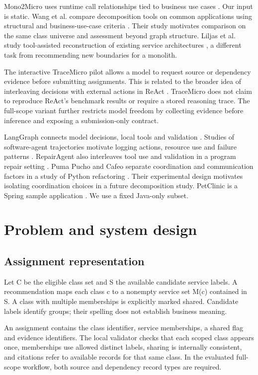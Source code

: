 Mono2Micro uses runtime call relationships tied to business use cases \cite{kalia2021}. Our input is static. Wang et al. compare decomposition tools on common applications using structural and business-use-case criteria \cite{wang2024}. Their study motivates comparison on the same class universe and assessment beyond graph structure. Liljas et al. study tool-assisted reconstruction of existing service architectures \cite{liljas2026}, a different task from recommending new boundaries for a monolith.

The interactive TraceMicro pilot allows a model to request source or dependency evidence before submitting assignments. This is related to the broader idea of interleaving decisions with external actions in ReAct \cite{yao2023}. TraceMicro does not claim to reproduce ReAct's benchmark results or require a stored reasoning trace. The full-scope variant further restricts model freedom by collecting evidence before inference and exposing a submission-only contract.

LangGraph connects model decisions, local tools and validation \cite{langgraph}. Studies of software-agent trajectories motivate logging actions, resource use and failure patterns \cite{trajectories2025}. RepairAgent also interleaves tool use and validation in a program repair setting \cite{repairagent2025}. Puma Pucho and Cafeo separate coordination and communication factors in a study of Python refactoring \cite{puchocafeo2026}. Their experimental design motivates isolating coordination choices in a future decomposition study. PetClinic is a Spring sample application \cite{petclinic}. We use a fixed Java-only subset.

\section{Problem and system design}

\subsection{Assignment representation}

Let C be the eligible class set and S the available candidate service labels. A recommendation maps each class c to a nonempty service set M(c) contained in S. A class with multiple memberships is explicitly marked shared. Candidate labels identify groups; their spelling does not establish business meaning.

An assignment contains the class identifier, service memberships, a shared flag and evidence identifiers. The local validator checks that each scoped class appears once, memberships use allowed distinct labels, sharing is internally consistent, and citations refer to available records for that same class. In the evaluated full-scope workflow, both source and dependency record types are required.

